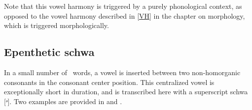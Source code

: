 
Note that this vowel harmony is triggered by a purely phonological context, as opposed to the vowel harmony described in \SEC\ref{VH} in the chapter on morphology, which is triggered morphologically. 


\subsection{Epenthetic schwa}\label{epentheticSchwa}
In a small number of \PS\ words, a vowel is inserted between two non-homorganic consonants in the consonant center position. %
This centralized vowel is exceptionally short in duration, and is transcribed here with a %
superscript schwa [ᵊ]. Two examples are provided in  and .

